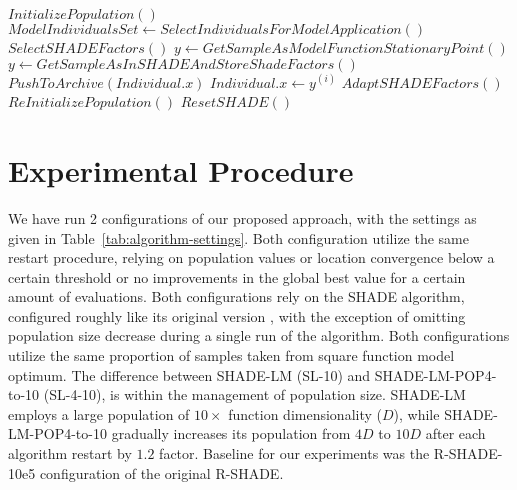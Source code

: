 \documentclass[sigconf]{acmart}
\begin{document}
\begin{algorithm}[H]
	\begin{algorithmic}[1]
	\footnotesize
	\State $InitializePopulation()$
		\State $ModelIndividualsSet \gets SelectIndividualsForModelApplication()$
		\State $SelectSHADEFactors()$
				\State $y \gets GetSampleAsModelFunctionStationaryPoint()$
			\Else
				\State $y \gets GetSampleAsInSHADEAndStoreShadeFactors()$
			\EndIf
				\State $PushToArchive(Individual.x)$
				\State $Individual.x \gets y^{(i)}$
			\EndIf
		\EndFor
		\State $AdaptSHADEFactors()$
			\State $ReInitializePopulation()$
			\State $ResetSHADE()$
		\EndIf
	\EndWhile
	\caption{SHADE-LM pseudocode%
	\label{alg:shade-lm}}
	\end{algorithmic}
	\end{algorithm}
  

%
\section{Experimental Procedure}

We have run 2 configurations of our proposed approach,
with the settings as given in Table~\ref{tab:algorithm-settings}.
Both configuration utilize the same restart procedure,
relying on population values or location convergence
below a certain threshold or no improvements in the global best
value for a certain amount of evaluations.
Both configurations rely on the SHADE algorithm,
configured roughly like its original version \cite{Tanabe2014},
with the exception of omitting population size decrease during
a single run of the algorithm.
Both configurations utilize the same proportion of samples
taken from square function model optimum.
The difference between SHADE-LM (SL-10) and SHADE-LM-POP4-to-10 (SL-4-10),
is within the management of population size.
SHADE-LM employs a large population of $10 \times$ function dimensionality ($D$),
while SHADE-LM-POP4-to-10 gradually increases its population from
$4D$ to $10D$ after each algorithm restart
by $1.2$ factor.
Baseline for our experiments was the R-SHADE-10e5 configuration of the original R-SHADE\cite{Tanabe2014}.
\end{document}
